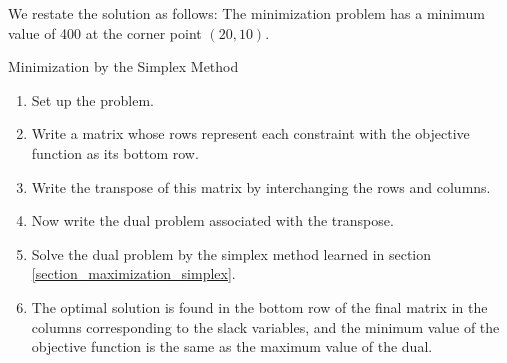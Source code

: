 We restate the solution as follows:
The minimization problem has a minimum value of 400 at the corner point $(20, 10)$.

\begin{summarybox}{Minimization by the Simplex Method}
    \begin{enumerate}
        \item Set up the problem.
        \item Write a matrix whose rows represent each constraint with the objective function as its bottom row.
        \item Write the transpose of this matrix by interchanging the rows and columns.
        \item Now write the dual problem associated with the transpose.
        \item Solve the dual problem by the simplex method learned in section \ref{section_maximization_simplex}.
        \item The optimal solution is found in the bottom row of the final matrix in the columns corresponding to the slack variables, and the minimum value of the objective function is the same as the maximum value of the dual.
    \end{enumerate}
\end{summarybox}
